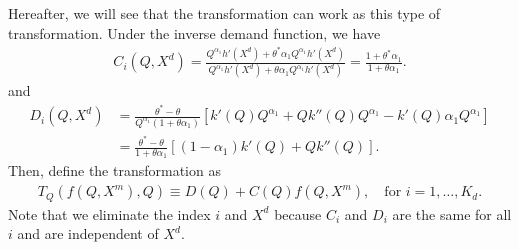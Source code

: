 \documentclass[11pt, a4paper]{article}
\theoremstyle{remark}
\begin{document}
Hereafter, we will see that the transformation can work as this type of transformation.
Under the inverse demand function, we have
\begin{align}
    C_i(Q, X^{d}) = \frac{Q^{\alpha_1}h'(X^{d}) + \theta^{*}\alpha_1Q^{\alpha_1}h'(X^{d})}{Q^{\alpha_1}h'(X^{d}) + \theta \alpha_1 Q^{\alpha_1}h'(X^{d})} = \frac{1 + \theta^{*}\alpha_1}{1 + \theta\alpha_1}.
\end{align}
and
\begin{align}
    D_i(Q, X^{d}) & = \frac{\theta^{*} - \theta}{Q^{\alpha_1}(1 + \theta \alpha_1)} \left[ k'(Q)Q^{\alpha_1} + Qk''(Q) Q^{\alpha_1} - k'(Q)\alpha_1Q^{\alpha_1} \right]\\
    &= \frac{\theta^{*} - \theta}{1 + \theta\alpha_1} \left[ (1 -\alpha_1)k'(Q) + Qk''(Q) \right].
\end{align}
Then, define the transformation as
\begin{align}
    T_Q\left(f(Q,X^{m}), Q\right) \equiv D(Q) + C(Q) f(Q, X^{m}), \quad \text{for } i = 1, \ldots, K_d.
\end{align}
Note that we eliminate the index $i$ and $X^{d}$ because $C_i$ and $D_i$ are the same for all $i$ and are independent of $X^{d}$.
\end{document}

